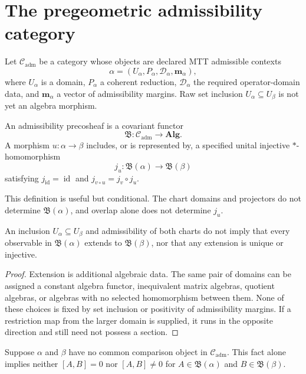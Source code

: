 \documentclass[11pt]{article}
\begin{document}
\section{The pregeometric admissibility category}

Let $\mathcal C_{\mathrm{adm}}$ be a category whose objects are declared MTT
admissible contexts
\[
 \alpha=(U_\alpha,P_\alpha,\mathcal D_\alpha,\mathbf m_\alpha),
\]
where $U_\alpha$ is a domain, $P_\alpha$ a coherent reduction,
$\mathcal D_\alpha$ the required operator-domain data, and
$\mathbf m_\alpha$ a vector of admissibility margins.  Raw set inclusion
$U_\alpha\subseteq U_\beta$ is not yet an algebra morphism.

\begin{definition}
An admissibility precosheaf is a covariant functor
\[
 \mathfrak B:\mathcal C_{\mathrm{adm}}\longrightarrow\mathbf{Alg}.
\]
A morphism $u:\alpha\to\beta$ includes, or is represented by, a specified
unital injective $*$-homomorphism
\[
 j_u:\mathfrak B(\alpha)\longrightarrow\mathfrak B(\beta)
\]
satisfying $j_{\operatorname{id}}=\operatorname{id}$ and
$j_{v\circ u}=j_v\circ j_u$.
\end{definition}

This definition is useful but conditional.  The chart domains and projectors
do not determine $\mathfrak B(\alpha)$, and overlap alone does not determine
$j_u$.

\begin{proposition}\label{prop:noextension}
An inclusion $U_\alpha\subseteq U_\beta$ and admissibility of both charts do
not imply that every observable in $\mathfrak B(\alpha)$ extends to
$\mathfrak B(\beta)$, nor that any extension is unique or injective.
\end{proposition}

\begin{proof}
Extension is additional algebraic data.  The same pair of domains can be
assigned a constant algebra functor, inequivalent matrix algebras, quotient
algebras, or algebras with no selected homomorphism between them.  None of
these choices is fixed by set inclusion or positivity of admissibility margins.
If a restriction map from the larger domain is supplied, it runs in the
opposite direction and still need not possess a section.
\end{proof}

\begin{proposition}
Suppose $\alpha$ and $\beta$ have no common comparison object in
$\mathcal C_{\mathrm{adm}}$.  This fact alone implies neither
$[A,B]=0$ nor $[A,B]\ne0$ for $A\in\mathfrak B(\alpha)$ and
$B\in\mathfrak B(\beta)$.
\end{proposition}
\end{document}
